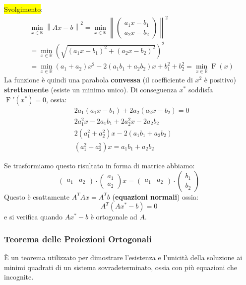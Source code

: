 \documentclass{article}
\begin{document}
\colorbox{yellow}{Svolgimento}:
\begin{align*}
     & \min_{x\in\mathbb R}\left\|Ax-b\right\|^2=\min_{x\in\mathbb R}\left\|\begin{pmatrix}
                                                                                a_1x-b_1 \\a_2x-b_2
                                                                            \end{pmatrix}\right\|^2                                   \\
     & =\min_{x\in\mathbb R}\left(\sqrt{\left(a_1x-b_1\right)^2+\left(a_2x-b_2\right)^2}\right)^2                                     \\
     & =\min_{x\in\mathbb R} \left(a_1+a_2\right)x^2-2\left(a_1b_1+a_2b_2\right)x+b_1^2+b_2^2=\min_{x\in\mathbb R}\operatorname{F}(x)
\end{align*}
La funzione è quindi una parabola \textbf{convessa} (il coefficiente di $x^2$ è positivo) \textbf{strettamente} (esiste un minimo unico).
Di conseguenza $x^\ast$ soddisfa $\operatorname{F}'(x^\ast)=0$, ossia:
\begin{align*}
     & 2a_1(a_1x-b_1)+2a_2(a_2x-b_2)=0                        \\
     & 2a_1^2x-2a_1b_1+2a_2^2x-2a_2b_2                        \\
     & 2\left(a_1^2+a_2^2\right)x-2\left(a_1b_1+a_2b_2\right) \\
     & \left(a_1^2+a_2^2\right)x=a_1b_1+a_2b_2
\end{align*}

Se trasformiamo questo risultato in forma di matrice abbiamo:\[\begin{pmatrix}
        a_1 & a_2
    \end{pmatrix}\cdot\begin{pmatrix}
        a_1 \\
        a_2
    \end{pmatrix}x=\begin{pmatrix}
        a_1 & a_2
    \end{pmatrix}\cdot\begin{pmatrix}
        b_1 \\b_2
    \end{pmatrix}
\]
Questo è esattamente $A^TAx=A^Tb$ (\textbf{equazioni normali}) ossia:\[\boxed{A^T\left(Ax^\ast-b\right)=0}\]
e si verifica quando $Ax^\ast-b$ è ortogonale ad $A$.

\subsubsection{Teorema delle Proiezioni Ortogonali}
È un teorema utilizzato per dimostrare l'esistenza e l'unicità della soluzione ai minimi quadrati di un sistema sovradeterminato, ossia con più equazioni che incognite.
\end{document}
